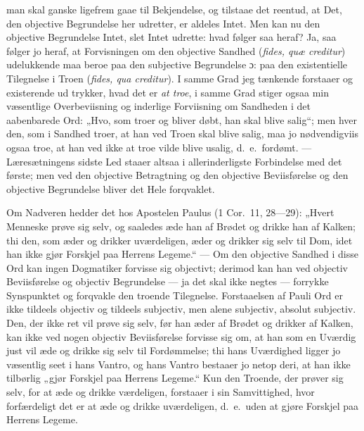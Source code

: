man skal ganske ligefrem gaae til Bekjendelse, og tilstaae det
reentud, at Det, den objective Begrundelse her udretter, er
aldeles Intet. Men kan nu den objective Begrundelse Intet, slet
Intet udrette: hvad følger saa heraf? Ja, saa følger jo heraf, at
Forvisningen om den objective Sandhed (\textit{fides, quæ
creditur}) udelukkende maa beroe paa den subjective Begrundelse
ɔ: paa den existentielle Tilegnelse i Troen (\textit{fides, qua
creditur}). I samme Grad jeg tænkende forstaaer og existerende ud%
trykker, hvad det er \emph{at troe}, i samme Grad stiger ogsaa min
væsentlige Overbeviisning og inderlige Forviisning om Sandheden i
det aabenbarede Ord: „Hvo, som troer og bliver døbt, han skal
blive salig“; men hver den, som i Sandhed troer, at han ved Troen
skal blive salig, maa jo nødvendigviis ogsaa troe, at han ved ikke
at troe vilde blive usalig, d.\ e.\ fordømt. --- Læresætningens
sidste Led staaer altsaa i allerinderligste Forbindelse med det
første; men ved den objective Betragtning og den objective
Beviisførelse og den objective Begrundelse bliver det Hele
forqvaklet.

Om Nadveren hedder det hos Apostelen Paulus (1 Cor.\ 11, 28---29):
„Hvert Menneske prøve sig selv, og saaledes æde han af Brødet og
drikke han af Kalken; thi den, som æder og drikker uværdeligen,
æder og drikker sig selv til Dom, idet han ikke gjør Forskjel paa
Herrens Legeme.“ --- Om den objective Sandhed i disse Ord kan
ingen Dogmatiker forvisse sig objectivt; derimod kan han ved
objectiv Beviisførelse og objectiv Begrundelse --- ja det skal
ikke negtes --- forrykke Synspunktet og forqvakle den troende
Tilegnelse. Forstaaelsen af Pauli Ord er ikke tildeels objectiv og
tildeels subjectiv, men alene subjectiv, absolut subjectiv. Den,
der ikke ret vil prøve sig selv, før han æder af Brødet og drikker
af Kalken, kan ikke ved nogen objectiv Beviisførelse forvisse sig
om, at han som en Uværdig just vil æde og drikke sig selv til
Fordømmelse; thi hans Uværdighed ligger jo væsentlig seet i hans
Vantro, og hans
 Vantro bestaaer jo netop deri, at han ikke tilbørlig „gjør
Forskjel paa Herrens Legeme.“ Kun den Troende, der prøver sig
selv, for at æde og drikke værdeligen, forstaaer i sin
Samvittighed, hvor forfærdeligt det er at æde og drikke
uværdeligen, d.\ e.\ uden at gjøre Forskjel paa Herrens Legeme.

